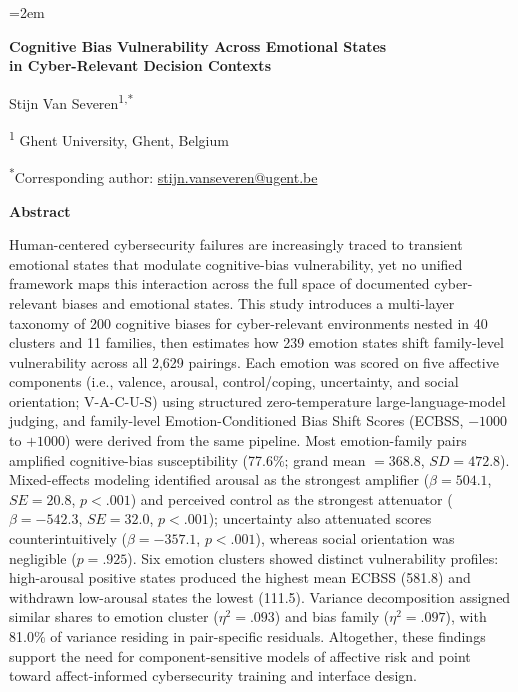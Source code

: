 \documentclass[12pt,a4paper]{article}
\newcommand{\ecbss}{\textsc{ECBSS}}
\newcommand{\vacus}{V-A-C-U-S}
\begin{document}
\emergencystretch=2em

\begin{titlepage}
\thispagestyle{titlepagestyle}
\vspace*{1.4cm}
\begin{center}
{\fontsize{18}{22}\selectfont\bfseries Cognitive Bias Vulnerability Across Emotional States\\[2pt] in Cyber-Relevant Decision Contexts\par}
\vspace{1.8cm}
{\large Stijn Van Severen\textsuperscript{1,*}\par}
\vspace{0.30cm}
{\normalsize \textsuperscript{1} Ghent University, Ghent, Belgium\par}
\vspace{0.15cm}
{\normalsize \textsuperscript{*}Corresponding author: \href{mailto:stijn.vanseveren@ugent.be}{stijn.vanseveren@ugent.be}\par}
\end{center}
\vspace{1.0cm}
\begin{center}
\textbf{Abstract}
\end{center}
\begin{center}
\begin{minipage}{0.92\textwidth}
Human-centered cybersecurity failures are increasingly traced to transient emotional states that modulate cognitive-bias vulnerability, yet no unified framework maps this interaction across the full space of documented cyber-relevant biases and emotional states. This study introduces a multi-layer taxonomy of 200 cognitive biases for cyber-relevant environments nested in 40 clusters and 11 families, then estimates how 239 emotion states shift family-level vulnerability across all 2,629 pairings. Each emotion was scored on five affective components (i.e., valence, arousal, control/coping, uncertainty, and social orientation; \vacus{}) using structured zero-temperature large-language-model judging, and family-level Emotion-Conditioned Bias Shift Scores (\ecbss{}, $-1000$ to $+1000$) were derived from the same pipeline. Most emotion-family pairs amplified cognitive-bias susceptibility (77.6\%; grand mean $= 368.8$, $SD = 472.8$). Mixed-effects modeling identified arousal as the strongest amplifier ($\beta = 504.1$, $SE = 20.8$, $p < .001$) and perceived control as the strongest attenuator ($\beta = -542.3$, $SE = 32.0$, $p < .001$); uncertainty also attenuated scores counterintuitively ($\beta = -357.1$, $p < .001$), whereas social orientation was negligible ($p = .925$). Six emotion clusters showed distinct vulnerability profiles: high-arousal positive states produced the highest mean \ecbss{} (581.8) and withdrawn low-arousal states the lowest (111.5). Variance decomposition assigned similar shares to emotion cluster ($\eta^2 = .093$) and bias family ($\eta^2 = .097$), with 81.0\% of variance residing in pair-specific residuals. Altogether, these findings support the need for component-sensitive models of affective risk and point toward affect-informed cybersecurity training and interface design.

\end{minipage}
\end{center}
\end{titlepage}
\end{document}
